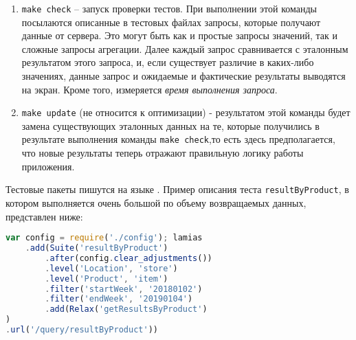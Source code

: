 \begin{enumerate}
  \item \lstinline{make check} – запуск проверки тестов. При выполнении этой команды посылаются описанные в тестовых файлах запросы, которые получают данные от сервера. Это могут быть как и простые запросы значений, так и сложные запросы агрегации. Далее каждый запрос сравнивается с эталонным результатом этого запроса, и, если существует различие в каких-либо значениях, данные запрос и ожидаемые и фактические результаты выводятся на экран. Кроме того, измеряется \emph{время выполнения запроса}.
  \item \lstinline{make update} (не относится к оптимизации) - результатом этой команды будет замена существующих эталонных данных на те, которые получились в результате выполнения команды \lstinline{make check},то есть здесь предполагается, что новые результаты теперь отражают правильную логику работы приложения.
\end{enumerate}

Тестовые пакеты пишутся на языке \js. Пример описания теста \lstinline{resultByProduct}, в котором выполняется очень большой по объему возвращаемых данных, представлен ниже:

\begin{lstlisting}[language=Javascript]
var config = require('./config'); lamias
    .add(Suite('resultByProduct')
        .after(config.clear_adjustments())
        .level('Location', 'store')
        .level('Product', 'item')
        .filter('startWeek', '20180102')
        .filter('endWeek', '20190104')
        .add(Relax('getResultsByProduct')
)
.url('/query/resultByProduct'))
\end{lstlisting}

